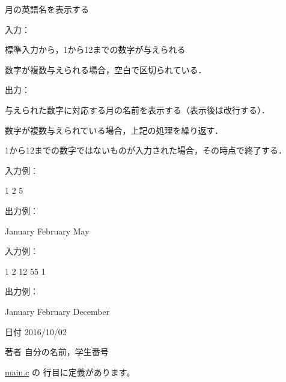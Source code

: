 月の英語名を表示する 

入力：
\begin{DoxyItemize}
\item 標準入力から，1から12までの数字が与えられる
\item 数字が複数与えられる場合，空白で区切られている．
\end{DoxyItemize}

出力：
\begin{DoxyItemize}
\item 与えられた数字に対応する月の名前を表示する（表示後は改行する）．
\item 数字が複数与えられている場合，上記の処理を繰り返す．
\item 1から12までの数字ではないものが入力された場合，その時点で終了する．
\end{DoxyItemize}

入力例： \begin{DoxyVerb}1 2 5
\end{DoxyVerb}
 出力例： \begin{DoxyVerb}January
February
May
\end{DoxyVerb}
 入力例： \begin{DoxyVerb}1 2 12 55 1
\end{DoxyVerb}
 出力例： \begin{DoxyVerb}January
February
December
\end{DoxyVerb}
 \begin{DoxyDate}{日付}
2016/10/02 
\end{DoxyDate}
\begin{DoxyAuthor}{著者}
自分の名前，学生番号 
\end{DoxyAuthor}


 \hyperlink{main_8c_source}{main.\-c} の  行目に定義があります。


